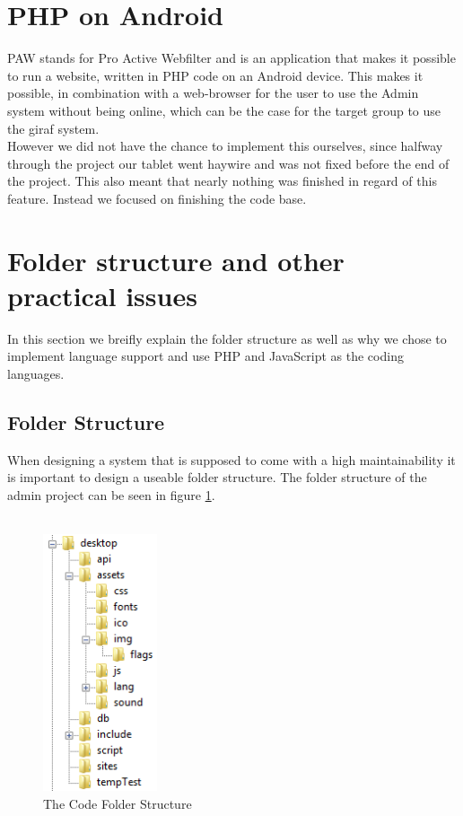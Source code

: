 \section{PHP on Android}
PAW stands for Pro Active Webfilter and is an application that makes it possible to run a website, written in PHP code on an Android device. This makes it possible, in combination with a web-browser for the user to use the Admin system without being online, which can be the case for the target group to use the \ac{giraf} system.\\
However we did not have the chance to implement this ourselves, since halfway through the project our tablet went haywire and was not fixed before the end of the project. This also meant that nearly nothing was finished in regard of this feature. Instead we focused on finishing the code base.

\section{Folder structure and other practical issues}
In this section we breifly explain the folder structure as well as why we chose to implement language support and use PHP and JavaScript as the coding languages.

\subsection{Folder Structure}
When designing a system that is supposed to come with a high maintainability it is important to design a useable folder structure. The folder structure of the admin project can be seen in figure \ref{fig:folderStructure}.\\
\\

\begin{figure}[htbp]
        \centering
                \includegraphics[width=0.3\textwidth]{images/folderStructure.png}
        \caption{The Code Folder Structure}
        \label{fig:folderStructure}
\end{figure}

